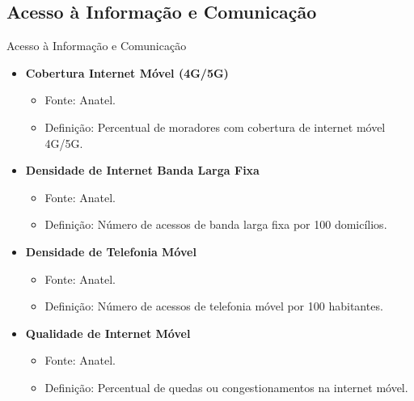 \documentclass{beamer}
\begin{document}
\subsection{Acesso à Informação e Comunicação}
\begin{frame}{Acesso à Informação e Comunicação}
\begin{itemize}
    \item \textbf{Cobertura Internet Móvel (4G/5G)}
    \begin{itemize}
        \item Fonte: Anatel.
        \item Definição: Percentual de moradores com cobertura de internet móvel 4G/5G.
    \end{itemize}
    \item \textbf{Densidade de Internet Banda Larga Fixa}
    \begin{itemize}
        \item Fonte: Anatel.
        \item Definição: Número de acessos de banda larga fixa por 100 domicílios.
    \end{itemize}
    \item \textbf{Densidade de Telefonia Móvel}
    \begin{itemize}
        \item Fonte: Anatel.
        \item Definição: Número de acessos de telefonia móvel por 100 habitantes.
    \end{itemize}
    \item \textbf{Qualidade de Internet Móvel}
    \begin{itemize}
        \item Fonte: Anatel.
        \item Definição: Percentual de quedas ou congestionamentos na internet móvel.
    \end{itemize}
\end{itemize}
\end{frame}
\end{document}
